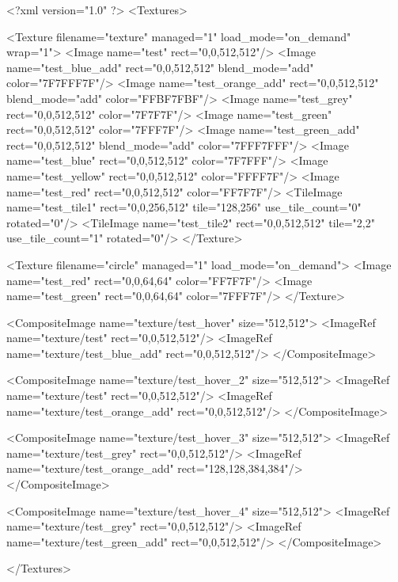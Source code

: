 <?xml version="1.0" ?>
<Textures>

	<Texture filename="texture" managed="1" load_mode="on_demand" wrap="1">
		<Image name="test" rect="0,0,512,512"/>
		<Image name="test_blue_add" rect="0,0,512,512" blend_mode="add" color="7F7FFF7F"/>
		<Image name="test_orange_add" rect="0,0,512,512" blend_mode="add" color="FFBF7FBF"/>
		<Image name="test_grey" rect="0,0,512,512" color="7F7F7F"/>
		<Image name="test_green" rect="0,0,512,512" color="7FFF7F"/>
		<Image name="test_green_add" rect="0,0,512,512" blend_mode="add" color="7FFF7FFF"/>
		<Image name="test_blue" rect="0,0,512,512" color="7F7FFF"/>
		<Image name="test_yellow" rect="0,0,512,512" color="FFFF7F"/>
		<Image name="test_red" rect="0,0,512,512" color="FF7F7F"/>
		<TileImage name="test_tile1" rect="0,0,256,512" tile="128,256" use_tile_count="0" rotated="0"/>
		<TileImage name="test_tile2" rect="0,0,512,512" tile="2,2" use_tile_count="1" rotated="0"/>
	</Texture>
	
	<Texture filename="circle" managed="1" load_mode="on_demand">
		<Image name="test_red" rect="0,0,64,64" color="FF7F7F"/>
		<Image name="test_green" rect="0,0,64,64" color="7FFF7F"/>
	</Texture>
	
	<CompositeImage name="texture/test_hover" size="512,512">
		<ImageRef name="texture/test" rect="0,0,512,512"/>
		<ImageRef name="texture/test_blue_add" rect="0,0,512,512"/>
	</CompositeImage>
	
	<CompositeImage name="texture/test_hover_2" size="512,512">
		<ImageRef name="texture/test" rect="0,0,512,512"/>
		<ImageRef name="texture/test_orange_add" rect="0,0,512,512"/>
	</CompositeImage>
	
	<CompositeImage name="texture/test_hover_3" size="512,512">
		<ImageRef name="texture/test_grey" rect="0,0,512,512"/>
		<ImageRef name="texture/test_orange_add" rect="128,128,384,384"/>
	</CompositeImage>
	
	<CompositeImage name="texture/test_hover_4" size="512,512">
		<ImageRef name="texture/test_grey" rect="0,0,512,512"/>
		<ImageRef name="texture/test_green_add" rect="0,0,512,512"/>
	</CompositeImage>
	
</Textures>
